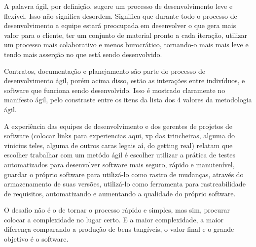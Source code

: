 \documentclass[10pt,a4paper,font=plain]{abnt}
\begin{document}
A palavra ágil, por definição, sugere um processo de desenvolvimento leve e flexível. Isso não significa desordem. Significa que durante todo o processo de desenvolvimento a equipe estará preocupada em desenvolver o que gera mais valor para o cliente, ter um conjunto de material pronto a cada iteração, utilizar um processo mais colaborativo e menos burocrático, tornando-o mais mais leve e tendo mais asserção no que está sendo desenvolvido.

Contratos, documentação e planejamento são parte do processo de desenvolvimento ágil, porém acima disso, estão as interações entre indivíduos, e software que funciona sendo desenvolvido. Isso é mostrado claramente no manifesto ágil, pelo constraste entre os itens da lista dos 4 valores da metodologia ágil.

A experiência das equipes de desenvolvimento e dos gerentes de projetos de software (colocar links para experiencias aqui, xp das trincheiras, alguma do vinicius teles, alguma de outros caras legais aí, do getting real) relatam que escolher trabalhar com um metódo ágil é escolher utilizar a prática de testes automatizados para desenvolver software mais seguro, rápido e manutenível, guardar o próprio software para utilizá-lo como rastro de mudanças, através do armazenamento de suas versões, utilizá-lo como ferramenta para rastreabilidade de requisitos, automatizando e aumentando a qualidade do próprio software. 

O desafio não é o de tornar o processo rápido e simples, mas sim, procurar colocar a complexidade no lugar certo. E a maior complexidade, a maior diferença comparando a produção de bens tangíveis, o valor final e o grande objetivo é o software.



\end{document}
